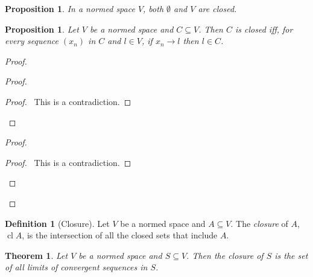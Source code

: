 \documentclass{book}
\let\qed\relax
\newtheorem{prop}[ax]{Proposition}
\newtheorem{thm}[ax]{Theorem}
\theoremstyle{definition}
\newtheorem{df}[ax]{Definition}
\newcommand{\cl}{\ensuremath{\operatorname{cl}}}
\begin{document}
\begin{prop}
In a normed space $V$, both $\emptyset$ and $V$ are closed.
\end{prop}

\begin{prop}
\label{prop:closedconverge}
Let $V$ be a normed space and $C \subseteq V$. Then $C$ is closed iff, for every sequence $(x_n)$ in $C$ and $l \in V$, if $x_n \rightarrow l$ then $l \in C$.
\end{prop}

\begin{proof}
\pf
{}
\begin{proof}
	\qedstep
	\begin{proof}
		\pf\ This is a contradiction.
	\end{proof}
\end{proof}
\begin{proof}
	\qedstep
	\begin{proof}
		\pf\ This is a contradiction.
	\end{proof}
\end{proof}
\qed
\end{proof}

\begin{df}[Closure]
Let $V$ be a normed space and $A \subseteq V$. The \emph{closure} of $A$, $\cl A$, is the intersection of all the closed sets that include $A$.
\end{df}

\begin{thm}
\label{thm:closureaslimits}
Let $V$ be a normed space and $S \subseteq V$. Then the closure of $S$ is the set of all limits of convergent sequences in $S$.
\end{thm}
\end{document}
